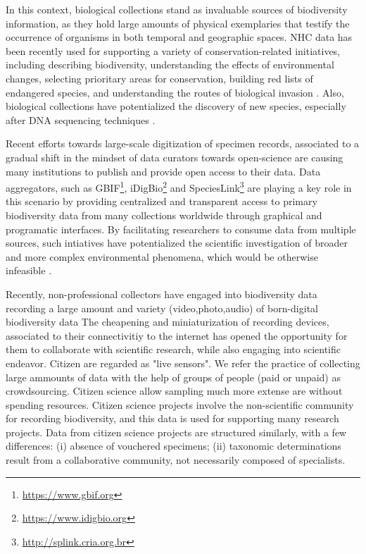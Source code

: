 In this context, biological collections stand as invaluable sources of biodiversity information, as they hold large amounts of physical exemplaries that testify the occurrence of organisms in both temporal and geographic spaces.
NHC data has been recently used for supporting a variety of conservation-related initiatives, including describing biodiversity, understanding the effects of environmental changes, selecting prioritary areas for conservation, building red lists of endangered species, and understanding the routes of biological invasion \cite{Nualart2017, kemp2015}. %
Also, biological collections have potentialized the discovery of new species, especially after DNA sequencing techniques \cite{Kemp2015}.

Recent efforts towards large-scale digitization of specimen records, associated to a gradual shift in the mindset of data curators towards open-science are causing many institutions to publish and provide open access to their data.
Data aggregators, such as GBIF\footnote{\url{https://www.gbif.org}}, iDigBio\footnote{\url{https://www.idigbio.org}} and SpeciesLink\footnote{\url{http://splink.cria.org.br}} are playing a key role in this scenario by providing centralized and transparent access to primary biodiversity data from many collections worldwide through graphical and programatic interfaces.
By facilitating researchers to consume data from multiple sources, such intiatives have potentialized the scientific investigation of broader and more complex environmental phenomena, which would be otherwise infeasible \cite{James2018}.

Recently, non-professional collectors have engaged into biodiversity data recording a large amount and variety (video,photo,audio) of born-digital biodiversity data
The cheapening and miniaturization of recording devices, associated to their connectivitiy to the internet has opened the opportunity for them to collaborate with scientific research, while also engaging into scientific endeavor.
Citizen are regarded as "live sensors".
We refer the practice of collecting large ammounts of data with the help of groups of people (paid or unpaid) as crowdsourcing.
Citizen science allow sampling much more extense are without spending resources.
Citizen science projects involve the non-scientific community for recording biodiversity, and this data is used for supporting many research projects.
Data from citizen science projects are structured similarly, with a few differences: (i) absence of vouchered specimens; (ii) taxonomic determinations result from a collaborative community, not necessarily composed of specialists. 

